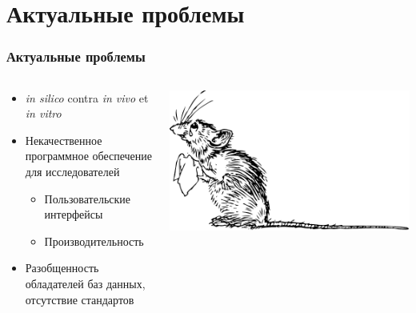 \section{Актуальные проблемы}
\begin{frame}
  \frametitle{Актуальные проблемы}
  \begin{columns}
    \begin{column}{0.7\textwidth}
  \begin{itemize}
    \item \emph{in silico} contra \emph{in vivo} et \emph{in vitro}
    \item Некачественное программное обеспечение для исследователей
      \begin{itemize}
        \item Пользовательские интерфейсы
        \item Производительность
      \end{itemize}
    \item Разобщенность обладателей баз данных, отсутствие стандартов 
  \end{itemize}
   \end{column}
   \begin{column}{0.2\textwidth}
     \includegraphics[scale=0.5]{images/mouse.pdf}
   \end{column}
   \end{columns}
\end{frame}

